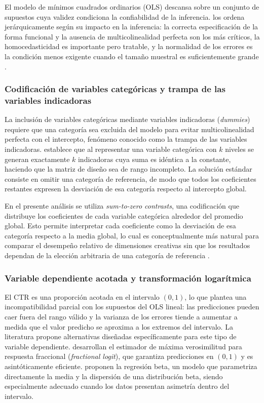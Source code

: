 \documentclass[12pt, a4paper]{report}
\begin{document}
El modelo de mínimos cuadrados ordinarios (OLS) descansa sobre un conjunto de supuestos
cuya validez condiciona la confiabilidad de la inferencia. \citet{fox2016} los ordena
jerárquicamente según su impacto en la inferencia: la correcta especificación de la
forma funcional y la ausencia de multicolinealidad perfecta son los más críticos, la
homocedasticidad es importante pero tratable, y la normalidad de los errores es la condición
menos exigente cuando el tamaño muestral es suficientemente grande
\citep[Cap.~5]{fox2016}.

\subsubsection*{Codificación de variables categóricas y trampa de las variables indicadoras}

La inclusión de variables categóricas mediante variables indicadoras (\textit{dummies})
requiere que una categoría sea excluida del modelo para evitar multicolinealidad perfecta
con el intercepto, fenómeno conocido como la trampa de las variables indicadoras.
\citet[p.~163]{fox2016} establece que al representar una variable categórica con $k$
niveles se generan exactamente $k$ indicadoras cuya suma es idéntica a la constante,
haciendo que la matriz de diseño sea de rango incompleto. La solución estándar consiste
en omitir una categoría de referencia, de modo que todos los coeficientes restantes
expresen la desviación de esa categoría respecto al intercepto global.

En el presente análisis se utiliza \textit{sum-to-zero contrasts}, una codificación que
distribuye los coeficientes de cada variable categórica alrededor del promedio global. Esto permite
interpretar cada coeficiente como la desviación de esa categoría respecto a la
media global, lo cual es conceptualmente más natural para comparar el desempeño
relativo de dimensiones creativas sin que los resultados dependan de la elección
arbitraria de una categoría de referencia \citep[Cap.~8]{fox2016}.

\subsubsection*{Variable dependiente acotada y transformación logarítmica}

El CTR es una proporción acotada en el intervalo $(0, 1)$, lo que plantea una
incompatibilidad parcial con los supuestos del OLS lineal: las predicciones pueden
caer fuera del rango válido y la varianza de los errores tiende a aumentar a medida
que el valor predicho se aproxima a los extremos del intervalo. La literatura propone
alternativas diseñadas específicamente para este tipo de variable dependiente.
\citet{papke1996} desarrollan el estimador de máxima verosimilitud para respuesta
fraccional (\textit{fractional logit}), que garantiza predicciones en $(0,1)$ y es
asintóticamente eficiente. \citet{ferrari2004} proponen la regresión beta, un modelo
que parametriza directamente la media y la dispersión de una distribución beta, siendo
especialmente adecuado cuando los datos presentan asimetría dentro del intervalo.
\end{document}
